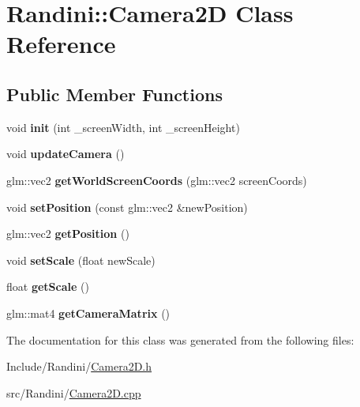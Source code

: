 \hypertarget{classRandini_1_1Camera2D}{
\section{Randini::Camera2D Class Reference}
\label{classRandini_1_1Camera2D}
}
\subsection*{Public Member Functions}
\begin{DoxyCompactItemize}
\item 
\hypertarget{classRandini_1_1Camera2D_ab658d7f26ed3fec10ac4e16882ea85e0}{
void {\bfseries init} (int \_\-screenWidth, int \_\-screenHeight)}
\label{classRandini_1_1Camera2D_ab658d7f26ed3fec10ac4e16882ea85e0}

\item 
\hypertarget{classRandini_1_1Camera2D_a6624d7fd91cdf68e305568aa2ace5539}{
void {\bfseries updateCamera} ()}
\label{classRandini_1_1Camera2D_a6624d7fd91cdf68e305568aa2ace5539}

\item 
\hypertarget{classRandini_1_1Camera2D_a545b5ce7ca9f2c99b8fc7837d6ee4872}{
glm::vec2 {\bfseries getWorldScreenCoords} (glm::vec2 screenCoords)}
\label{classRandini_1_1Camera2D_a545b5ce7ca9f2c99b8fc7837d6ee4872}

\item 
\hypertarget{classRandini_1_1Camera2D_a13745cf68d6dc73d6759b3a3ee1c4cb1}{
void {\bfseries setPosition} (const glm::vec2 \&newPosition)}
\label{classRandini_1_1Camera2D_a13745cf68d6dc73d6759b3a3ee1c4cb1}

\item 
\hypertarget{classRandini_1_1Camera2D_ad9bb40c09c7f51960574a795124bf1ad}{
glm::vec2 {\bfseries getPosition} ()}
\label{classRandini_1_1Camera2D_ad9bb40c09c7f51960574a795124bf1ad}

\item 
\hypertarget{classRandini_1_1Camera2D_a6446d430b1c5b5c3f3435c5ebc8fdfa6}{
void {\bfseries setScale} (float newScale)}
\label{classRandini_1_1Camera2D_a6446d430b1c5b5c3f3435c5ebc8fdfa6}

\item 
\hypertarget{classRandini_1_1Camera2D_a6e5515a9d361baef52afc11deba94426}{
float {\bfseries getScale} ()}
\label{classRandini_1_1Camera2D_a6e5515a9d361baef52afc11deba94426}

\item 
\hypertarget{classRandini_1_1Camera2D_adac18a3635569b0868c5d77e8f8635a8}{
glm::mat4 {\bfseries getCameraMatrix} ()}
\label{classRandini_1_1Camera2D_adac18a3635569b0868c5d77e8f8635a8}

\end{DoxyCompactItemize}


The documentation for this class was generated from the following files:\begin{DoxyCompactItemize}
\item 
Include/Randini/\hyperlink{Camera2D_8h}{Camera2D.h}\item 
src/Randini/\hyperlink{Camera2D_8cpp}{Camera2D.cpp}\end{DoxyCompactItemize}

